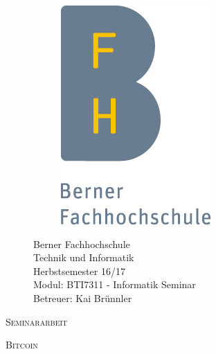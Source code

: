 \documentclass[a4paper, 12pt, DIV11, BCOR5mm, tikz]{scrartcl}
\newcommand{\thema}{Bitcoin}
\begin{document}
\thispagestyle{empty}

\begin{titlepage}
    \begin{figure}
        \begin{minipage}{0.3\textwidth}
            \begin{figure}[H]
                \includegraphics[scale=0.5]{BFH_Logo}
            \end{figure}
        \end{minipage}
        \hfill
        \begin{minipage}[t]{0.5\textwidth}
            \begin{flushright}
                Berner Fachhochschule\\
                Technik und Informatik\\
                \bigskip
                Herbstsemester 16/17\\
                \bigskip
                Modul: BTI7311 - Informatik Seminar\\
                Betreuer: Kai Brünnler\\
            \end{flushright}
        \end{minipage}
    \end{figure}
    \setlength{\textfloatsep}{4cm}
    {\centering
    {\scshape\large Seminararbeit \par}
    {\scshape\LARGE\thema\par}}
    \vfill
    \begin{figure}[!hb]

\end{figure}
\end{titlepage}
\end{document}
